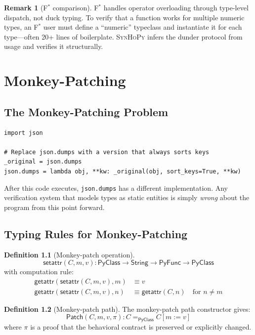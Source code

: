 \documentclass[11pt,a4paper]{report}
\theoremstyle{definition}
\newtheorem{definition}{Definition}[chapter]
\newtheorem{remark}[definition]{Remark}
\theoremstyle{plain}
\newcommand{\PyClass}{\mathsf{PyClass}}
\newcommand{\PyFunc}{\mathsf{PyFunc}}
\newcommand{\fstar}{F$^{*}$}
\newcommand{\synhopy}{\textsc{SynHoPy}}
\begin{document}
\begin{remark}[\fstar{} comparison]
\fstar{} handles operator overloading through type-level dispatch, not duck
typing. To verify that a function works for multiple numeric types, an \fstar{}
user must define a ``numeric'' typeclass and instantiate it for each type---often
20+ lines of boilerplate. \synhopy{} infers the dunder protocol from usage and
verifies it structurally.
\end{remark}


\chapter{Monkey-Patching}
\label{ch:monkey}

\section{The Monkey-Patching Problem}

\begin{lstlisting}[style=python]
import json

# Replace json.dumps with a version that always sorts keys
_original = json.dumps
json.dumps = lambda obj, **kw: _original(obj, sort_keys=True, **kw)
\end{lstlisting}

After this code executes, \lstinline[style=python]{json.dumps} has a different
implementation. Any verification system that models types as static entities
is simply \emph{wrong} about the program from this point forward.

\section{Typing Rules for Monkey-Patching}

\begin{definition}[Monkey-patch operation]
\[
  \mathsf{setattr}(C, m, v) : \PyClass \to \mathsf{String} \to \PyFunc \to \PyClass
\]
with computation rule:
\begin{align}
  \mathsf{getattr}(\mathsf{setattr}(C, m, v), m) &\equiv v \\
  \mathsf{getattr}(\mathsf{setattr}(C, m, v), n) &\equiv \mathsf{getattr}(C, n) \quad \text{for } n \neq m
\end{align}
\end{definition}

\begin{definition}[Monkey-patch path]
The monkey-patch path constructor gives:
\[
  \mathsf{Patch}(C, m, v, \pi) : C =_{\PyClass} C[m := v]
\]
where $\pi$ is a proof that the behavioral contract is preserved or explicitly
changed.
\end{definition}
\end{document}
